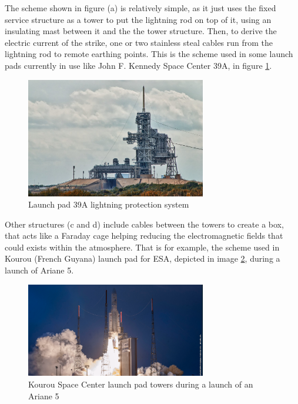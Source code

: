 The scheme shown in figure (a) is relatively simple, as it just uses the fixed
service structure as a tower to put the lightning rod on top of it, using an
insulating mast between it and the the tower structure. Then, to derive the
electric current of the strike, one or two stainless steal cables run from the
lightning rod to remote earthing points. This is the scheme used in some launch
pads currently in use like John F. Kennedy Space Center 39A, in figure \ref{fig:39a}.

\begin{figure}[h!]
	\centering
	\includegraphics[width=0.7\textwidth]{img/39a.jpg}
	\caption{Launch pad 39A lightning protection system}
	\label{fig:39a}
\end{figure}

Other structures (c and d) include cables between the towers to create a box,
that acts like a Faraday cage helping reducing the electromagnetic fields that
could exists within the atmosphere. That is for example, the scheme used in
Kourou (French Guyana) launch pad for ESA, depicted in image \ref{fig:ariane5_towers},
during a launch of Ariane 5.

\begin{figure}[h!]
	\centering
	\includegraphics[width=0.7\textwidth]{img/ariane5_towers.png}
	\caption{Kourou Space Center launch pad towers during a launch of an Ariane 5}
	\label{fig:ariane5_towers}
\end{figure}

